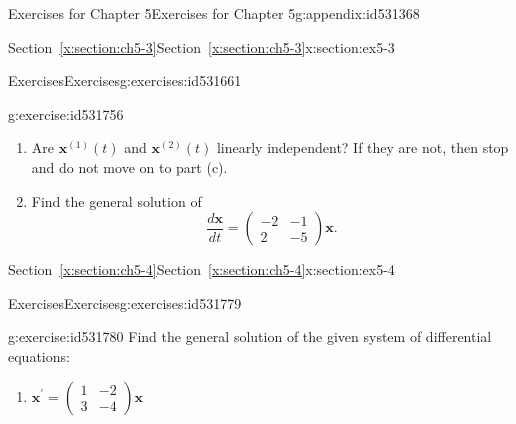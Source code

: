 \documentclass[oneside,10pt,]{book}
\newcommand{\xreffont}{\relax}
\numberwithin{equation}{section}
\numberwithin{equation}{section}
\newcommand{\amp}{&}
\begin{document}
\begin{appendixptx}{Exercises for Chapter 5}{}{Exercises for Chapter 5}{}{}{g:appendix:id531368}
\begin{sectionptx}{Section~{\xreffont\ref*{x:section:ch5-3}}}{}{Section~{\xreffont\ref*{x:section:ch5-3}}}{}{}{x:section:ex5-3}
\begin{exercises-subsection-numberless}{Exercises}{}{Exercises}{}{}{g:exercises:id531661}
\begin{divisionexercise}{3}{}{}{g:exercise:id531756}
\begin{enumerate}[label=(\alph*)]
\begin{equation*}
\mathbf{x}^{(1)}(t)=\left(\begin{array}{c}
e^{-3t}-2e^{-4t}\\
e^{-3t}-4e^{-4t}
\end{array}\right)\text{ and }\mathbf{x}^{(2)}(t)=\left(\begin{array}{c}
2e^{-3t}+e^{-4t}\\
2e^{-3t}+2e^{-4t}
\end{array}\right)
\end{equation*}
%
\item{}Are \(\mathbf{x}^{(1)}(t)\) and \(\mathbf{x}^{(2)}(t)\) linearly independent? If they are not, then stop and do not move on to part (c).%
\item{}Find the general solution of%
\begin{equation*}
\frac{d\mathbf{x}}{dt}=\left(\begin{array}{cc}
-2 \amp -1\\
2 \amp -5
\end{array}\right)\mathbf{x}.
\end{equation*}
%
\end{enumerate}
\end{divisionexercise}%
\end{exercises-subsection-numberless}
\end{sectionptx}
%
%
\typeout{************************************************}
\typeout{Section F.4 Section~{\xreffont\ref*{x:section:ch5-4}}}
\typeout{************************************************}
%
\begin{sectionptx}{Section~{\xreffont\ref*{x:section:ch5-4}}}{}{Section~{\xreffont\ref*{x:section:ch5-4}}}{}{}{x:section:ex5-4}
%
%
\typeout{************************************************}
\typeout{************************************************}
%
\begin{exercises-subsection-numberless}{Exercises}{}{Exercises}{}{}{g:exercises:id531779}
\begin{divisionexercise}{1}{}{}{g:exercise:id531780}%
Find the general solution of the given system of differential equations:%
%
\begin{enumerate}[label=(\alph*)]
\item{}\(\displaystyle {\displaystyle \mathbf{x}^{\prime}=\left(\begin{array}{cc}
1 \amp -2\\
3 \amp -4
\end{array}\right)\mathbf{x}}\)%

\end{enumerate}
\end{divisionexercise}
\end{exercises-subsection-numberless}
\end{sectionptx}
\end{appendixptx}
\end{document}
